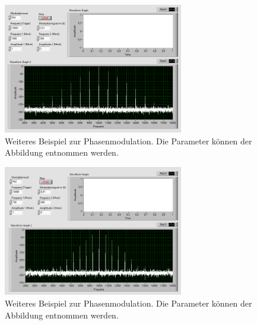 \begin{figure}[H]
	\centering
	\includegraphics[width=0.7\textwidth]{pic/t10km1kg001.png}
	\caption{Weiteres Beispiel zur Phasenmodulation. Die Parameter können der Abbildung entnommen werden.}
	\label{fig:a8}	
\end{figure} 

\begin{figure}[H]
	\centering
	\includegraphics[width=0.7\textwidth]{pic/t10km700g001.png}
	\caption{Weiteres Beispiel zur Phasenmodulation. Die Parameter können der Abbildung entnommen werden.}
	\label{fig:a9}	
\end{figure} 

